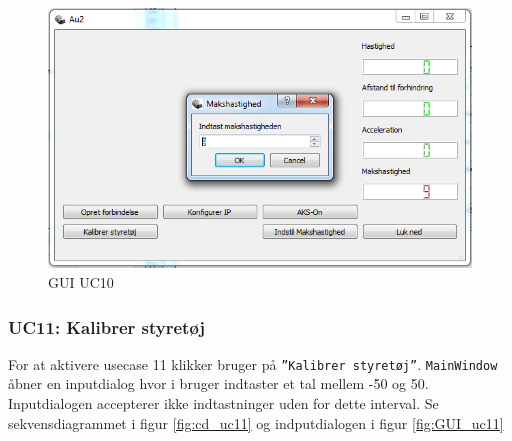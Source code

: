 \begin{figure}[H]
\centering
\includegraphics[width=\textwidth* 3/4,height=\textwidth* 9/20 ]{../fig/billeder/gui_uc10.png}
\caption{GUI UC10}
\label{fig:GUI_uc10}
\end{figure}

\subsubsection{UC11: Kalibrer styretøj}
For at aktivere usecase 11 klikker bruger på \texttt{''Kalibrer styretøj''}.
\texttt{MainWindow} åbner en inputdialog hvor i bruger indtaster et tal mellem -50 og 50. Inputdialogen accepterer ikke indtastninger uden for dette interval. Se sekvensdiagrammet i figur \ref{fig:cd_uc11} og indputdialogen i figur \ref{fig:GUI_uc11}

